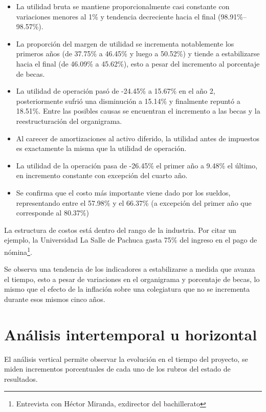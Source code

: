 \begin{itemize}
	\item La utilidad bruta se mantiene proporcionalmente casi constante con variaciones menores al 1\% y tendencia decreciente hacia el final (98.91\%--98.57\%).
	\item La proporción del margen de utilidad se incrementa notablemente los primeros años (de 37.75\% a 46.45\% y luego a 50.52\%) y tiende a estabilizarse hacia el final (de 46.09\% a 45.62\%), esto a pesar del incremento al porcentaje de becas.
	\item La utilidad de operación pasó de -24.45\% a 15.67\% en el año 2, posteriormente sufrió una disminución a 15.14\% y finalmente repuntó a 18.51\%. Entre las posibles causas se encuentran el incremento a las becas y la reestructuración del organigrama.
	\item Al carecer de amortizaciones al activo diferido, la utilidad antes de impuestos es exactamente la misma que la utilidad de operación.
	\item La utilidad de la operación pasa de -26.45\% el primer año a 9.48\% el último, en incremento constante con excepción del cuarto año.
	\item Se confirma que el costo más importante viene dado por los sueldos, representando entre el 57.98\% y el 66.37\% (a excepción del primer año que corresponde al 80.37\%)
\end{itemize}

La estructura de costos está dentro del rango de la industria. Por citar un ejemplo, la Universidad La Salle de Pachuca gasta 75\% del ingreso en el pago de nómina\footnote{Entrevista con Héctor Miranda, exdirector del bachillerato}.

Se observa una tendencia de los indicadores a estabilizarse a medida que avanza el tiempo, esto a pesar de variaciones en el organigrama y porcentaje de becas, lo mismo que el efecto de la inflación sobre una colegiatura que no se incrementa durante esos mismos cinco años.





\section{Análisis intertemporal u horizontal}
\label{sec:AnalisisHorizontal}

El análisis vertical permite observar la evolución en el tiempo del proyecto, se miden incrementos porcentuales de cada uno de los rubros del estado de resultados.

